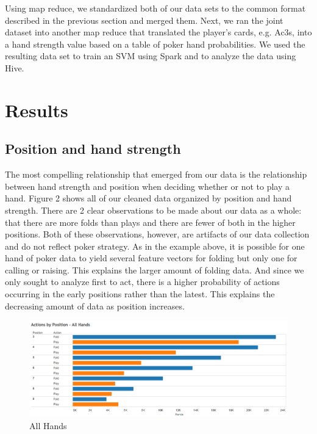 \documentclass[twoside]{article}
\begin{document}
\begin{multicols}{2}
Using map reduce, we standardized both of our data sets to the common format described in the previous section and merged them. Next, we ran the joint dataset into another map reduce that translated the player's cards, e.g. Ac3s, into a hand strength value based on a table of poker hand probabilities. We used the resulting data set to train an SVM using Spark and to analyze the data using Hive. 


\section{Results}

\subsection{Position and hand strength}

The most compelling relationship that emerged from our data is the relationship between hand strength and position when deciding whether or not to play a hand. Figure 2 shows all of our cleaned data organized by position and hand strength. There are 2 clear observations to be made about our data as a whole: that there are more folds than plays and there are fewer of both in the higher positions. Both of these observations, however, are artifacts of our data collection and do not reflect poker strategy. As in the example above, it is possible for one hand of poker data to yield several feature vectors for folding but only one for calling or raising. This explains the larger amount of folding data. And since we only sought to analyze first to act, there is a higher probability of actions occurring in the early positions rather than the latest. This explains the decreasing amount of data as position increases.

\begin{figure}[H]
  \centering
  \centerline{\includegraphics[width=1\columnwidth]{Allhands.png}}
   \caption{All Hands}
  \label{fig:allHands}
\end{figure}


\end{multicols}
\end{document}
